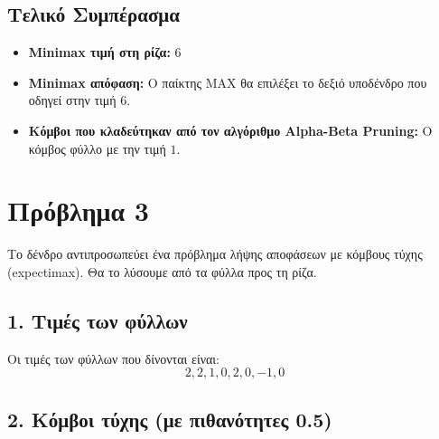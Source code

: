 \documentclass{article}
\begin{document}
\subsection*{Τελικό Συμπέρασμα}

\begin{itemize}
    \item \textbf{Minimax τιμή στη ρίζα:} \(6\)
    \item \textbf{Minimax απόφαση:} Ο παίκτης MAX θα επιλέξει το δεξιό υποδένδρο που οδηγεί στην τιμή \(6\).
    \item \textbf{Κόμβοι που κλαδεύτηκαν από τον αλγόριθμο Alpha-Beta Pruning:} Ο κόμβος φύλλο με την τιμή \(1\).
\end{itemize}

\section*{Πρόβλημα 3}

Το δένδρο αντιπροσωπεύει ένα πρόβλημα λήψης αποφάσεων με κόμβους τύχης (expectimax). Θα το λύσουμε από τα φύλλα προς τη ρίζα.

\subsection*{1. Τιμές των φύλλων}
Οι τιμές των φύλλων που δίνονται είναι:
\[
2, 2, 1, 0, 2, 0, -1, 0
\]

\subsection*{2. Κόμβοι τύχης (με πιθανότητες 0.5)}
\end{document}
